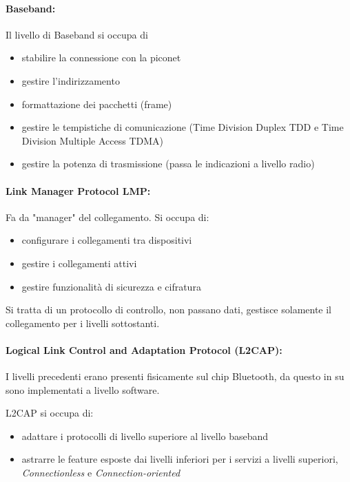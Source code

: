 \paragraph{Baseband:} Il livello di Baseband si occupa di 
\begin{itemize}
	\item stabilire la connessione con la piconet

	\item gestire l'indirizzamento

	\item formattazione dei pacchetti (frame)

	\item gestire le tempistiche di comunicazione (Time Division Duplex TDD e Time Division Multiple Access TDMA)

	\item gestire la potenza di trasmissione (passa le indicazioni a livello radio)
\end{itemize}

\paragraph{Link Manager Protocol LMP:} Fa da "manager" del collegamento. Si occupa di:
\begin{itemize}
	\item configurare i collegamenti tra dispositivi

	\item gestire i collegamenti attivi

	\item gestire funzionalità di sicurezza e cifratura
\end{itemize}

Si tratta di un protocollo di controllo, non passano dati, gestisce solamente il collegamento per i livelli sottostanti.

\paragraph{Logical Link Control and Adaptation Protocol (L2CAP):} I livelli precedenti erano presenti fisicamente sul chip Bluetooth, da questo in su sono implementati a livello software. 

L2CAP si occupa di:
\begin{itemize}
	\item adattare i protocolli di livello superiore al livello baseband
	
    \item astrarre le feature esposte dai livelli inferiori per i servizi a livelli superiori, \textit{Connectionless} e \textit{Connection-oriented}
\end{itemize}

